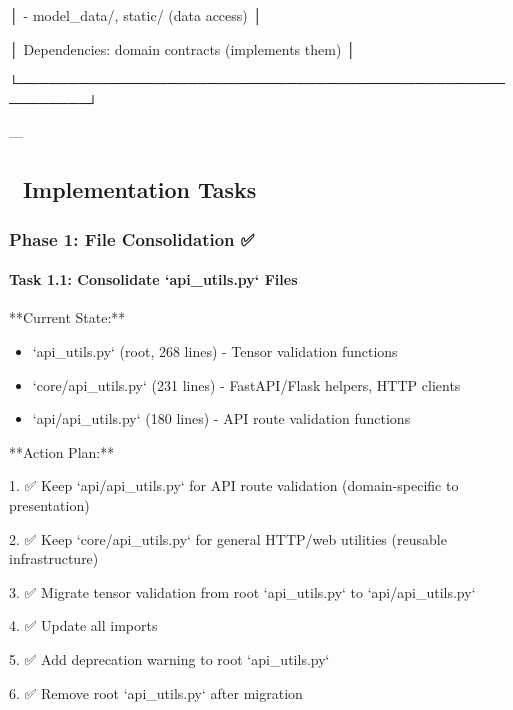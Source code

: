 \documentclass[11pt,a4paper]{article}
\begin{document}
│  - model\_data/, static/ (data access)                   │

│  Dependencies: domain contracts (implements them)      │

└─────────────────────────────────────────────────────────┘

---

\subsection{📝 Implementation Tasks}

\subsubsection{Phase 1: File Consolidation ✅}

\paragraph{Task 1.1: Consolidate `api_utils.py` Files}

**Current State:**

\begin{itemize}
\item `api_utils.py` (root, 268 lines) - Tensor validation functions
\end{itemize}

\begin{itemize}
\item `core/api_utils.py` (231 lines) - FastAPI/Flask helpers, HTTP clients
\end{itemize}

\begin{itemize}
\item `api/api_utils.py` (180 lines) - API route validation functions
\end{itemize}

**Action Plan:**

1. ✅ Keep `api/api\_utils.py` for API route validation (domain-specific to presentation)

2. ✅ Keep `core/api\_utils.py` for general HTTP/web utilities (reusable infrastructure)

3. ✅ Migrate tensor validation from root `api\_utils.py` to `api/api\_utils.py`

4. ✅ Update all imports

5. ✅ Add deprecation warning to root `api\_utils.py`

6. ✅ Remove root `api\_utils.py` after migration
\end{document}
